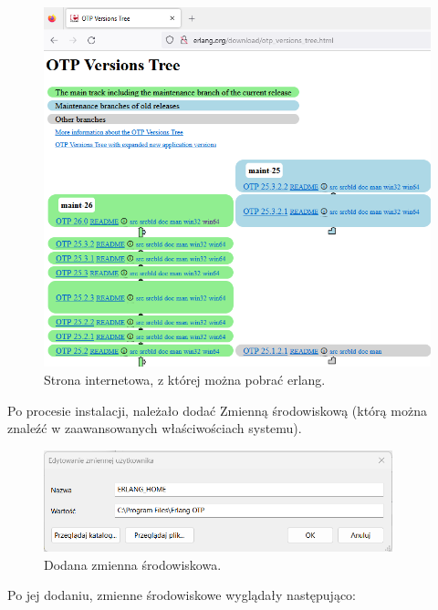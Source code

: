 \documentclass[12pt,twoside]{article}
\begin{document}
\begin{figure}[!htb]
\centering
\includegraphics[width=1\textwidth]{figures/fig1.png}
\caption{Strona internetowa, z której można pobrać erlang.}
\label{fig:zdjecie}
\end{figure}


Po procesie instalacji, należało dodać Zmienną środowiskową (którą można znaleźć w zaawansowanych właściwościach systemu).

\begin{figure}[!htb]
	\centering
	\includegraphics[width=0.9\textwidth]{figures/fig2.png}
	\caption{Dodana zmienna środowiskowa.}
	\label{fig:fig2}
\end{figure}

Po jej dodaniu, zmienne środowiskowe wyglądały następująco:
\end{document}
